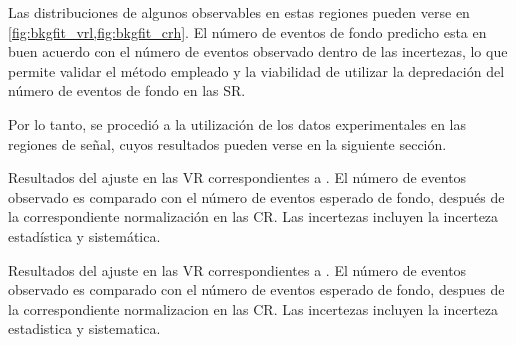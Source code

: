 Las distribuciones de algunos observables en estas regiones pueden verse en \cref{fig:bkgfit_vrl,fig:bkgfit_crh}.
El número de eventos de fondo predicho esta en buen acuerdo con el número de eventos
observado dentro de las incertezas, lo que permite validar el método empleado y la viabilidad de
utilizar la depredación del número de eventos de fondo en las SR.

Por lo tanto, se procedió a la utilización de los datos experimentales en las regiones
de señal, cuyos resultados pueden verse en la siguiente sección.






\begin{table}[!htbp]

  \caption{Resultados del ajuste en las VR correspondientes a {\SRL}.
    El número de eventos observado es comparado con el número de eventos esperado de fondo, después de la correspondiente
    normalización en las CR. Las incertezas incluyen la incerteza estadística y sistemática.}
  \label{tab:fit_result_vrl1}

  

\end{table}


\begin{table}[!htbp]

  \caption{Resultados del ajuste en las VR correspondientes a {\SRL}.
    El número de eventos observado es comparado con el número de eventos esperado de fondo, despues de la correspondiente
    normalizacion en las CR. Las incertezas incluyen la incerteza estadistica y sistematica.}
  \label{tab:fit_result_vrl2}

  

\end{table}


